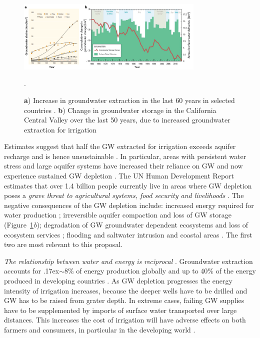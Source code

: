 \documentclass[11pt,final]{article}%
\newcommand{\mytilde}{\raise.17ex\hbox{$\scriptstyle\mathtt{\sim}$}}
\begin{document}
\begin{figure}[h]
\centering
\noindent\includegraphics[width=0.8\textwidth]{Figures/Figure1.png}
\caption{\textbf{a}) Increase in groundwater extraction in the last 60 years in selected countries \cite[modified from][]{UNESCO2012}. \textbf{b})  Change in groundwater storage in the California Central Valley over the last 50 years, due to increased groundwater extraction for irrigation \cite[modified from][]{Faunt2016}}.
\label{fig:GW Intro}
\end{figure}




Estimates suggest that half the GW extracted for irrigation exceeds aquifer recharge and is hence unsustainable \cite{Rost2008,Vorosmarty2000}. In particular, areas with persistent water stress and large aquifer systems have increased their reliance on GW and now experience sustained GW depletion \cite{Hanasaki2008,Wada2010,Scanlon2012}. The UN Human Development Report estimates that over 1.4 billion people currently live in areas where GW depletion poses a \emph{grave threat to agricultural systems, food security and livelihoods} \cite{UNESCO2012}. The negative consequences of the GW depletion include: increased energy required for water production \cite{Scanlon2012,Narayanamoorthy2015}; irreversible aquifer compaction and loss of GW storage (Figure~\ref{fig:GW Intro}\emph{b}); degradation of GW groundwater dependent ecosystems and loss of ecosystem services \cite{Klove2014,Doody2017}; flooding and saltwater intrusion and coastal areas \cite{Erban2014b,Alfarrah2018}.  The first two are most relevant to this proposal.

\emph{The relationship between water and energy is reciprocal} \cite{UNESCO2012}. Groundwater extraction accounts for \mytilde8\% of energy production globally and up to 40\% of the energy produced in developing countries \cite{WorldEconomicForum2011}.
As GW depletion progresses the energy intensity of irrigation increases, because the deeper wells have to be drilled and GW has to be raised from grater depth. In extreme cases, failing GW supplies have to be supplemented by imports of surface water transported over large distances. This increases the cost of irrigation will have adverse effects on both farmers and consumers, in particular in the developing world \cite{Narayanamoorthy2015}.
\end{document}

